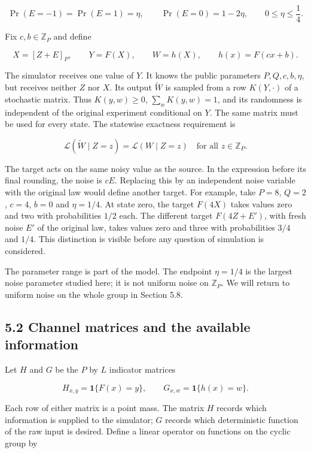 \documentclass[
]{article}
\begin{document}
\[
\Pr(E=-1)=\Pr(E=1)=\eta,
\qquad \Pr(E=0)=1-2\eta,
\qquad 0\le\eta\le\frac14.
\]

Fix \(c,b\in\mathbb Z_P\) and define

\[
X=[Z+E]_P,\qquad Y=F(X),\qquad W=h(X),
\qquad h(x)=F(cx+b).
\]

The simulator receives one value of \(Y\). It knows the public
parameters \(P,Q,c,b,\eta\), but receives neither \(Z\) nor \(X\). Its
output \(\widetilde W\) is sampled from a row \(K(Y,\cdot)\) of a
stochastic matrix. Thus \(K(y,w)\ge0\), \(\sum_w K(y,w)=1\), and its
randomness is independent of the original experiment conditional on
\(Y\). The same matrix must be used for every state. The statewise
exactness requirement is

\[
\mathcal L(\widetilde W\mid Z=z)=\mathcal L(W\mid Z=z)
\quad\text{for all }z\in\mathbb Z_P.
\]

The target acts on the same noisy value as the source. In the expression
before its final rounding, the noise is \(cE\). Replacing this by an
independent noise variable with the original law would define another
target. For example, take \(P=8\), \(Q=2\), \(c=4\), \(b=0\) and
\(\eta=1/4\). At state zero, the target \(F(4X)\) takes values zero and
two with probabilities \(1/2\) each. The different target \(F(4Z+E')\),
with fresh noise \(E'\) of the original law, takes values zero and three
with probabilities \(3/4\) and \(1/4\). This distinction is visible
before any question of simulation is considered.

The parameter range is part of the model. The endpoint \(\eta=1/4\) is
the largest noise parameter studied here; it is not uniform noise on
\(\mathbb Z_P\). We will return to uniform noise on the whole group in
Section 5.8.

\subsection{5.2 Channel matrices and the available
information}\label{channel-matrices-and-the-available-information}

Let \(H\) and \(G\) be the \(P\) by \(L\) indicator matrices

\[
H_{x,y}=\mathbf1\{F(x)=y\},
\qquad G_{x,w}=\mathbf1\{h(x)=w\}.
\]

Each row of either matrix is a point mass. The matrix \(H\) records
which information is supplied to the simulator; \(G\) records which
deterministic function of the raw input is desired. Define a linear
operator on functions on the cyclic group by
\end{document}
